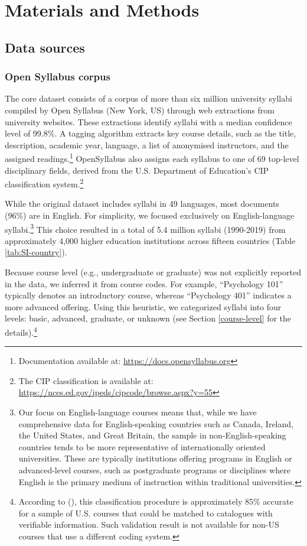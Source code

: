 \documentclass[
  british,
  12pt, %
]{article}
\begin{document}
\section{Materials and Methods}\label{sec:methods}

\subsection{Data sources}\label{data-sources}

\subsubsection{Open Syllabus corpus}\label{open-syllabus-corpus}

The core dataset consists of a corpus of more than six million university syllabi compiled by Open Syllabus (New York, US) through web extractions from university websites. These extractions identify syllabi with a median confidence level of 99.8\%. A tagging algorithm extracts key course details, such as the title, description, academic year, language, a list of anonymised instructors, and the assigned readings.\footnote{Documentation available at: \url{https://docs.opensyllabus.org}} OpenSyllabus also assigns each syllabus to one of 69 top-level disciplinary fields, derived from the U.S. Department of Education's CIP classification system.\footnote{
  The CIP classification is available at:
  \url{https://nces.ed.gov/ipeds/cipcode/browse.aspx?y=55}}

While the original dataset includes syllabi in 49 languages, most documents (96\%) are in English. For simplicity, we focused exclusively on English-language syllabi.\footnote{
  Our focus on English-language courses means that, while we have comprehensive data for English-speaking countries such as Canada, Ireland, the United States, and Great Britain, the sample in non-English-speaking countries tends to be more representative of internationally oriented universities. These are typically institutions offering programs in English or advanced-level courses, such as postgraduate programs or disciplines where English is the primary medium of instruction within traditional universities.} This choice resulted in a total of 5.4 million syllabi (1990-2019) from approximately 4,000 higher education institutions across fifteen countries (Table \ref{tab:SI-country}).

Because course level (e.g., undergraduate or graduate) was not explicitly reported in the data, we inferred it from course codes. For example, ``Psychology 101'' typically denotes an introductory course, whereas ``Psychology 401'' indicates a more advanced offering. Using this heuristic, we categorized syllabi into four levels: basic, advanced, graduate, or unknown (see Section \ref{course-level} for the details).\footnote{
  According to (), this classification procedure is approximately 85\% accurate for a sample of U.S. courses that could be matched to catalogues with verifiable information. Such validation result is not available for non-US courses that use a different coding system.}
\end{document}

